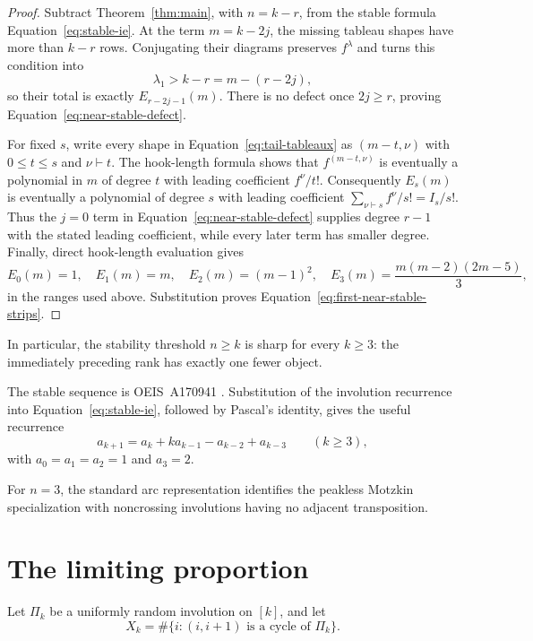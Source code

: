\documentclass[11pt]{article}
\theoremstyle{definition}
\begin{document}
\begin{proof}
Subtract Theorem~\ref{thm:main}, with $n=k-r$, from the stable formula
Equation~\eqref{eq:stable-ie}.  At the term $m=k-2j$, the missing tableau
shapes have more than $k-r$ rows.  Conjugating their diagrams preserves
$f^\lambda$ and turns this condition into
\[
 \lambda_1>k-r=m-(r-2j),
\]
so their total is exactly $E_{r-2j-1}(m)$.  There is no defect once
$2j\ge r$, proving Equation~\eqref{eq:near-stable-defect}.

For fixed $s$, write every shape in Equation~\eqref{eq:tail-tableaux} as
$(m-t,\nu)$ with $0\le t\le s$ and $\nu\vdash t$.  The hook-length formula
shows that $f^{(m-t,\nu)}$ is eventually a polynomial in $m$ of degree $t$
with leading coefficient $f^\nu/t!$.  Consequently $E_s(m)$ is eventually
a polynomial of degree $s$ with leading coefficient
$\sum_{\nu\vdash s}f^\nu/s!=I_s/s!$.  Thus the $j=0$ term in
Equation~\eqref{eq:near-stable-defect} supplies degree $r-1$ with the stated
leading coefficient, while every later term has smaller degree.  Finally,
direct hook-length evaluation gives
\[
 E_0(m)=1,\quad E_1(m)=m,\quad E_2(m)=(m-1)^2,\quad
 E_3(m)=\frac{m(m-2)(2m-5)}3,
\]
in the ranges used above.  Substitution proves
Equation~\eqref{eq:first-near-stable-strips}.
\end{proof}

In particular, the stability threshold $n\ge k$ is sharp for every $k\ge3$:
the immediately preceding rank has exactly one fewer object.

The stable sequence is OEIS~A170941 \cite{OEISA170941}.  Substitution of the
involution recurrence into Equation~\eqref{eq:stable-ie}, followed by
Pascal's identity, gives the useful recurrence
\begin{equation}\label{eq:stable-recurrence}
 a_{k+1}=a_k+k a_{k-1}-a_{k-2}+a_{k-3}\qquad(k\ge3),
\end{equation}
with $a_0=a_1=a_2=1$ and $a_3=2$.

For $n=3$, the standard arc representation identifies the peakless Motzkin
specialization with noncrossing involutions having no adjacent transposition.

\section{The limiting proportion}

Let $\Pi_k$ be a uniformly random involution on $[k]$, and let
\[
 X_k=\#\{i:(i,i+1)\text{ is a cycle of }\Pi_k\}.
\]
\end{document}
